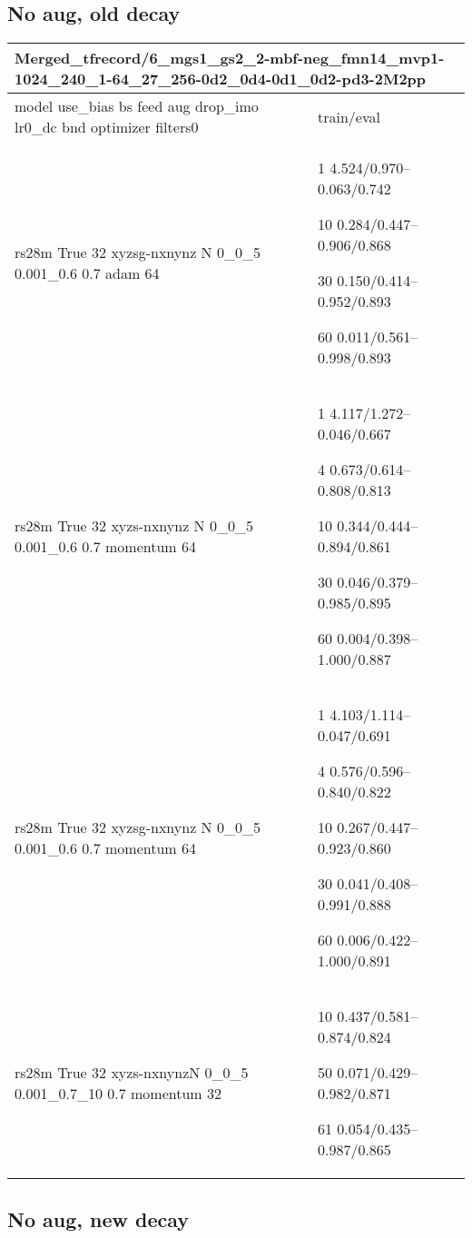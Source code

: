 \documentclass[,table,dvipsnames]{article}
\begin{document}
\subsection{No aug, old decay}
\noindent\begin{tabular}{|p{10cm}|p{5cm}| }	
	\hline
	\multicolumn{2}{|p{15cm}|}{Merged\_tfrecord/6\_mgs1\_gs2\_2-mbf-neg\_fmn14\_mvp1-1024\_240\_1-64\_27\_256-0d2\_0d4-0d1\_0d2-pd3-2M2pp}\\
	\hline
	model use\_bias bs feed aug drop\_imo lr0\_dc bnd optimizer filters0 & train/eval \\
	
	\rowcolor{red!20}
	rs28m True 32 xyzsg-nxnynz N 0\_0\_5 0.001\_0.6 0.7 adam 64&
	1 4.524/0.970--0.063/0.742\par 10 0.284/0.447--0.906/0.868\par 30 0.150/0.414--0.952/0.893\par 60 0.011/0.561--0.998/0.893 \\
	
	\rowcolor{blue!20}
	rs28m True 32 xyzs-nxnynz N 0\_0\_5 0.001\_0.6 0.7 momentum 64&
	1 4.117/1.272--0.046/0.667\par 4 0.673/0.614--0.808/0.813\par 10 0.344/0.444--0.894/0.861\par 30 0.046/0.379--0.985/0.895\par 60 0.004/0.398--1.000/0.887\\
	
	\rowcolor{yellow!20}
	rs28m True 32 xyzsg-nxnynz N 0\_0\_5 0.001\_0.6 0.7 momentum 64&
	1 4.103/1.114--0.047/0.691\par 4 0.576/0.596--0.840/0.822\par 10 0.267/0.447--0.923/0.860\par  30 0.041/0.408--0.991/0.888\par 60 0.006/0.422--1.000/0.891\\
	
	\rowcolor{green!20}
	rs28m True 32 xyzs-nxnynzN 0\_0\_5 0.001\_0.7\_10 0.7 momentum 32&
	10 0.437/0.581--0.874/0.824\par 50 0.071/0.429--0.982/0.871\par 61 0.054/0.435--0.987/0.865\\
	
	 
	
	\hline 
\end{tabular}

\subsection{No aug, new decay}
\end{document}
